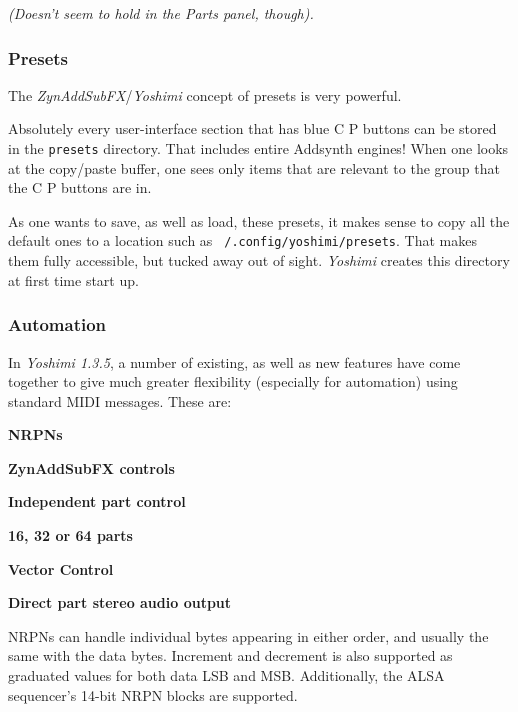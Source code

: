    \textsl{(Doesn't seem to hold in the Parts panel, though).}

\subsubsection{Presets}
\label{subsubsec:stock_settings_elements_presets}

   The \textsl{ZynAddSubFX}/\textsl{Yoshimi} concept of presets is very
   powerful.

   Absolutely every user-interface section that has blue C P buttons can be
   stored in the \texttt{presets} directory. That includes entire Addsynth
   engines! When one looks at the copy/paste buffer, one sees only items that
   are relevant to the group that the C P buttons are in.

   As one wants to save, as well as load, these presets, it makes sense to copy
   all the default ones to a location such as
   \texttt{~/.config/yoshimi/presets}. That makes them fully accessible, but
   tucked away out of sight.  \textsl{Yoshimi} creates this directory at first
   time start up.

\subsubsection{Automation}
\label{subsubsec:stock_settings_elements_automation}

   In \textsl{Yoshimi 1.3.5}, a number of existing, as well as new features
   have come together to give much greater flexibility (especially for
   automation) using standard MIDI messages. These are:

   \begin{enumber}
      \item \textbf{NRPNs}
      \item \textbf{ZynAddSubFX controls}
      \item \textbf{Independent part control}
      \item \textbf{16, 32 or 64 parts}
      \item \textbf{Vector Control}
      \item \textbf{Direct part stereo audio output}
   \end{enumber}

   \setcounter{ItemCounter}{0}      %

   NRPNs can handle individual bytes appearing in either order, and usually the
   same with the data bytes. Increment and decrement is also supported as
   graduated values for both data LSB and MSB. Additionally, the ALSA
   sequencer's 14-bit NRPN blocks are supported.

